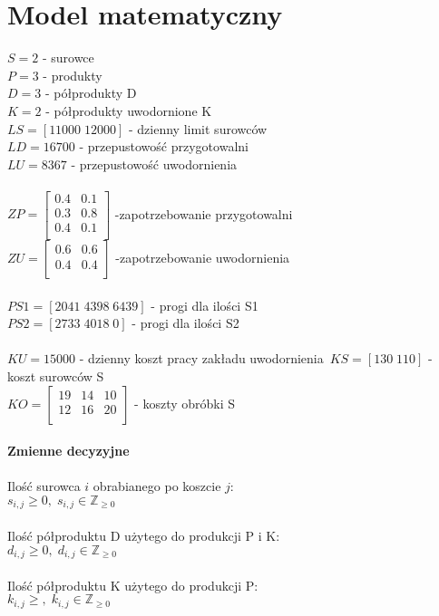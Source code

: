 \documentclass[a4paper, 10pt]{article}
\begin{document}
\section{Model matematyczny}


$S=2$ - surowce \\
$P=3$ - produkty \\
$D=3$ - półprodukty D \\
$K=2$ - półprodukty uwodornione K \\


$LS=[11000 \;12000] $ - dzienny limit surowców \\
$LD = 16700$ - przepustowość przygotowalni\\
$LU = 8367$ - przepustowość uwodornienia \\ \hfill\\
$ZP=
\begin{bmatrix}
0.4 & 0.1  \\
0.3 & 0.8  \\
0.4  & 0.1 \\
\end{bmatrix} $ -zapotrzebowanie przygotowalni\\
$ZU = 
\begin{bmatrix}
0.6 & 0.6  \\
0.4 & 0.4  \\
\end{bmatrix} $ -zapotrzebowanie uwodornienia\\ \hfill\\
$PS1 = [2041 \; 4398 \; 6439] $ - progi dla ilości S1\\
$PS2 = [2733 \; 4018 \; 0] $ - progi dla ilości S2\\ \hfill\\

$KU =  15000 $ - dzienny koszt pracy zakładu uwodornienia\
$KS = [130 \; 110] $ - koszt surowców S\\
$KO = 
\begin{bmatrix}
19 & 14  & 10\\
12 & 16 & 20 \\
\end{bmatrix} $ - koszty obróbki S\\ \hfill\\


{\bf Zmienne decyzyjne\\}
\hfill \\
Ilość surowca $i$ obrabianego po koszcie $j$: \\
$s_{i,j} \ge 0, \; s_{i,j} \in \mathbb Z_{\ge 0}$\\
\hfill\\
Ilość półproduktu D użytego do produkcji P i K: \\
$d_{i,j}  \ge 0,\; d_{i,j} \in \mathbb Z_{\ge 0}$  \\
\hfill\\
Ilość półproduktu K użytego do produkcji P: \\
$k_{i,j}  \ge ,\; k_{i,j} \in \mathbb Z_{\ge 0}$ \\  
\end{document}
